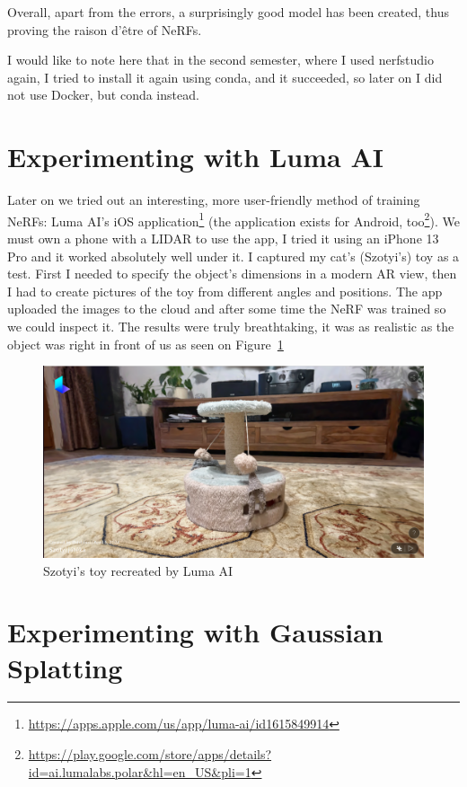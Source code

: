 Overall, apart from the errors, a surprisingly good model has been created, thus proving the raison d'être of NeRFs.

I would like to note here that in the second semester, where I used nerfstudio again, I tried to install it again using conda, and it succeeded, so later on I did not use Docker, but conda instead.

\section{Experimenting with Luma AI}

Later on we tried out an interesting, more user-friendly method of training NeRFs: Luma AI's iOS application\footnote{\url{https://apps.apple.com/us/app/luma-ai/id1615849914}} (the application exists for Android, too\footnote{\url{https://play.google.com/store/apps/details?id=ai.lumalabs.polar&hl=en_US&pli=1}}). We must own a phone with a LIDAR to use the app, I tried it using an iPhone 13 Pro and it worked absolutely well under it. I captured my cat's (Szotyi's) toy as a test. First I needed to specify the object's dimensions in a modern AR view, then I had to create pictures of the toy from different angles and positions. The app uploaded the images to the cloud and after some time the NeRF was trained so we could inspect it. The results were truly breathtaking, it was as realistic as the object was right in front of us as seen on Figure~\ref{fig:luma_ai_szotyi_toy}

\begin{figure}[htbp]
	\centering
	\includegraphics[width=150mm, keepaspectratio]{figures/szotyi_jateka_luma_ai.png}
	\caption{Szotyi's toy recreated by Luma AI}
	\label{fig:luma_ai_szotyi_toy}
\end{figure}

\section{Experimenting with Gaussian Splatting}

